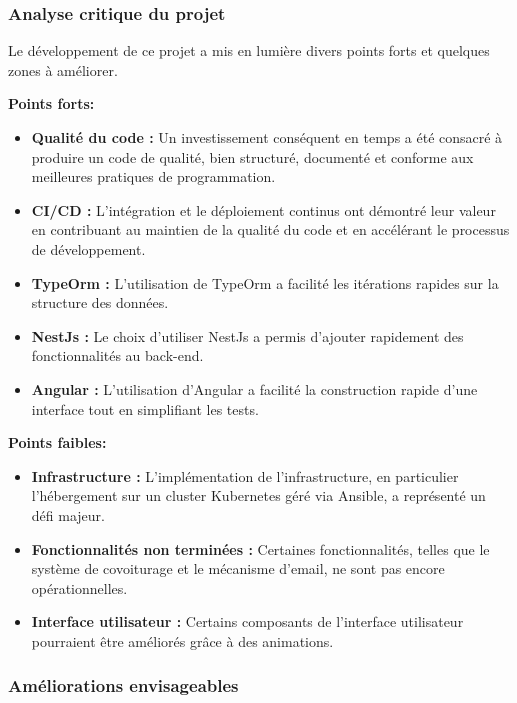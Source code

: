 \subsubsection{Analyse critique du projet}\label{subsubsec:analyse-critique}

Le développement de ce projet a mis en lumière divers points forts et quelques zones à améliorer.

\textbf{Points forts:}
\begin{itemize}
    \item \textbf{Qualité du code :} Un investissement conséquent en temps a été consacré à produire un code de qualité, bien structuré, documenté et conforme aux meilleures pratiques de programmation.
    \item \textbf{CI/CD :} L'intégration et le déploiement continus ont démontré leur valeur en contribuant au maintien de la qualité du code et en accélérant le processus de développement.
    \item \textbf{TypeOrm :} L'utilisation de TypeOrm a facilité les itérations rapides sur la structure des données.
    \item \textbf{NestJs :} Le choix d'utiliser NestJs a permis d'ajouter rapidement des fonctionnalités au back-end.
    \item \textbf{Angular :} L'utilisation d'Angular a facilité la construction rapide d'une interface tout en simplifiant les tests.
\end{itemize}

\textbf{Points faibles:}
\begin{itemize}
    \item \textbf{Infrastructure :} L'implémentation de l'infrastructure, en particulier l'hébergement sur un cluster Kubernetes géré via Ansible, a représenté un défi majeur.
    \item \textbf{Fonctionnalités non terminées :} Certaines fonctionnalités, telles que le système de covoiturage et le mécanisme d'email, ne sont pas encore opérationnelles.
    \item \textbf{Interface utilisateur :} Certains composants de l'interface utilisateur pourraient être améliorés grâce à des animations.
\end{itemize}

\subsubsection{Améliorations envisageables}\label{subsubsec:ameliorations}

